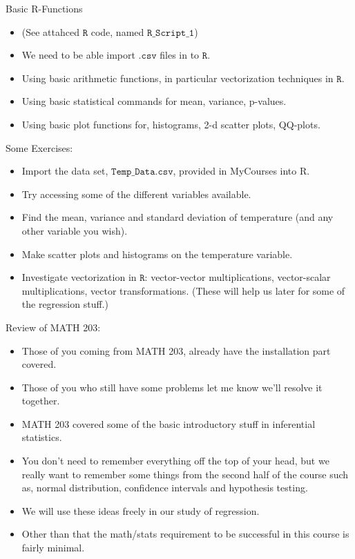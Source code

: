 \documentclass{beamer}
\begin{document}
	
	\begin{frame}{Basic R-Functions}
		\begin{itemize}
			\item (See attahced $\mathtt{R}$ code, named $\mathtt{R\_Script\_1}$)
			\item We need to be able import $\mathtt{.csv}$ files in to $\mathtt{R}$.
			\item Using basic arithmetic functions, in particular vectorization techniques in $\mathtt{R}$.
			\item Using basic statistical commands for mean, variance, p-values.
			\item Using basic plot functions for, histograms, 2-d scatter plots, QQ-plots.
		\end{itemize}
	\end{frame}
	\begin{frame}{Some Exercises:}
		\begin{itemize}
			\item Import the data set, $\mathtt{Temp\_Data.csv}$,  provided in MyCourses into R.
			\item Try accessing some of the different variables available.
			\item Find the mean, variance and standard deviation of temperature (and any other variable you wish).
			\item Make scatter plots and histograms on the temperature variable.
			\item Investigate vectorization in $\mathtt{R}$: vector-vector multiplications, vector-scalar multiplications, vector transformations. (These will help us later for some of the regression stuff.)
		\end{itemize}
	\end{frame}
	\begin{frame}{Review of MATH 203:}
		\begin{itemize}
			\item Those of you coming from MATH 203, already have the installation part covered.
			\item Those of you who still have some problems let me know we'll resolve it together.
			\item MATH 203 covered some of the basic introductory stuff in inferential statistics.
			\item You don't need to remember everything off the top of your head, but we really want to remember some things from the second half of the course such as, normal distribution, confidence intervals and hypothesis testing.
			\item We will use these ideas freely in our study of regression.
			\item Other than that the math/stats requirement to be successful in this course is fairly minimal.
		\end{itemize}
	\end{frame}
	
\end{document}
